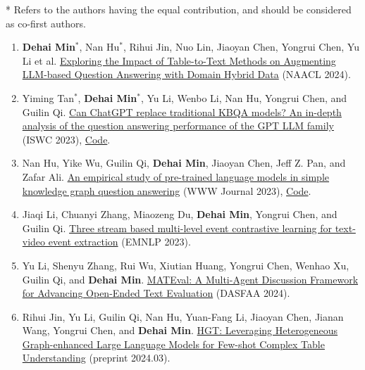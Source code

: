 \documentclass[a4paper,12pt]{article}
\begin{document}
* Refers to the authors having the equal contribution, and should be considered as co-first authors.
\begin{enumerate}

\item \textbf{Dehai Min}$^*$, Nan Hu$^*$, Rihui Jin, Nuo Lin, Jiaoyan Chen, Yongrui Chen, Yu Li et al. \href{https://arxiv.org/abs/2402.12869}{Exploring the Impact of Table-to-Text Methods on Augmenting LLM-based Question Answering with Domain Hybrid Data} (NAACL 2024).

\item Yiming Tan$^*$, \textbf{Dehai Min}$^*$, Yu Li, Wenbo Li, Nan Hu, Yongrui Chen, and Guilin Qi. \href{https://link.springer.com/chapter/10.1007/978-3-031-47240-4_19}{Can ChatGPT replace traditional KBQA models? An in-depth analysis of the question answering performance of the GPT LLM family} (ISWC 2023), \href{https://github.com/tan92hl/Complex-Question-Answering-Evaluation-of-GPT-family}{Code}.

\item Nan Hu, Yike Wu, Guilin Qi, \textbf{Dehai Min}, Jiaoyan Chen, Jeff Z. Pan, and Zafar Ali. \href{https://link.springer.com/article/10.1007/s11280-023-01166-y}{An empirical study of pre-trained language models in simple knowledge graph question answering} (WWW Journal 2023), \href{https://github.com/HuuuNan/PLMs-in-Practical-KBQA}{Code}.

\item Jiaqi Li, Chuanyi Zhang, Miaozeng Du, \textbf{Dehai Min}, Yongrui Chen, and Guilin Qi. \href{https://aclanthology.org/2023.emnlp-main.103/}{Three stream based multi-level event contrastive learning for text-video event extraction} (EMNLP 2023).

\item Yu Li, Shenyu Zhang, Rui Wu, Xiutian Huang, Yongrui Chen, Wenhao Xu, Guilin Qi, and \textbf{Dehai Min}. \href{https://arxiv.org/abs/2403.19305}{MATEval: A Multi-Agent Discussion Framework for Advancing Open-Ended Text Evaluation} (DASFAA 2024).

\item Rihui Jin, Yu Li, Guilin Qi, Nan Hu, Yuan-Fang Li, Jiaoyan Chen, Jianan Wang, Yongrui Chen, and \textbf{Dehai Min}. \href{https://arxiv.org/abs/2403.19723}{HGT: Leveraging Heterogeneous Graph-enhanced Large Language Models for Few-shot Complex Table Understanding} (preprint 2024.03).
\end{enumerate}


\end{document}
